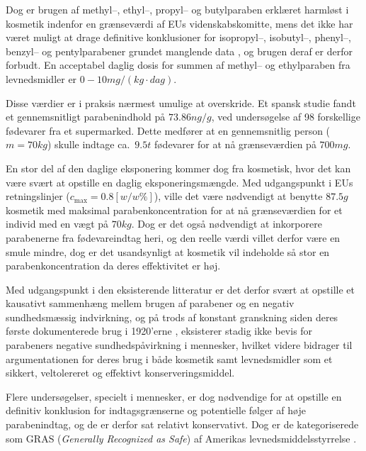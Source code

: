     Dog er brugen af methyl--, ethyl--, propyl-- og butylparaben erklæret harmløst i kosmetik indenfor en grænseværdi af EUs videnskabskomitte, mens det ikke har været muligt at drage definitive konklusioner for isopropyl--, isobutyl--, phenyl--, benzyl-- og pentylparabener grundet manglende data \parencite{Henr2013}, og brugen deraf er derfor forbudt. En acceptabel daglig dosis for summen af methyl-- og ethylparaben fra levnedsmidler er $0-10\si{mg\per (kg\cdot dag)}$.

    Disse værdier er i praksis nærmest umulige at overskride. Et spansk studie \parencite{Yola2020} fandt et gennemsnitligt parabenindhold på $73.86\si{ng\per g}$, ved undersøgelse af 98 forskellige fødevarer fra et supermarked. Dette medfører at en gennemsnitlig person ($m=70\si{kg}$) skulle indtage ca.\ $9.5\si{t}$ fødevarer for at nå grænseværdien på $700\si{mg}$.

    En stor del af den daglige eksponering kommer dog fra kosmetisk, hvor det kan være svært at opstille en daglig eksponeringsmængde. Med udgangspunkt i EUs retningslinjer ($c_{\text{max}}=0.8 \left[\si{w\per w\%}\right]$), ville det være nødvendigt at benytte $87.5\si{g}$ kosmetik med maksimal parabenkoncentration for at nå grænseværdien for et individ med en vægt på $70\si{kg}$. Dog er det også nødvendigt at inkorporere parabenerne fra fødevareindtag heri, og den reelle værdi villet derfor være en smule mindre, dog er det usandsynligt at kosmetik vil indeholde så stor en parabenkoncentration da deres effektivitet er høj.
    
    Med udgangspunkt i den eksisterende litteratur er det derfor svært at opstille et kausativt sammenhæng mellem brugen af parabener og en negativ sundhedsmæssig indvirkning, og på trods af konstant granskning siden deres første dokumenterede brug i 1920'erne \parencite{Mary1984}, eksisterer stadig ikke bevis for parabeners negative sundhedspåvirkning i mennesker, hvilket videre bidrager til argumentationen for deres brug i både kosmetik samt levnedsmidler som et sikkert, veltolereret og effektivt konserveringsmiddel. 

    Flere undersøgelser, specielt i mennesker, er dog nødvendige for at opstille en definitiv konklusion for indtagsgrænserne og potentielle følger af høje parabenindtag, og de er derfor sat relativt konservativt. Dog er de kategoriserede som GRAS (\textit{Generally Recognized as Safe}) af Amerikas levnedsmiddelsstyrrelse \parencite{FDA2022}.

